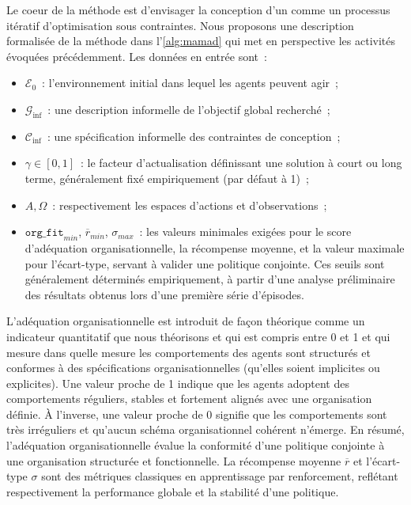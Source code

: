 Le coeur de la méthode  est d'envisager la conception d'un  comme un processus itératif d'optimisation sous contraintes. Nous proposons une description formalisée de la méthode  dans l'\autoref{alg:mamad} qui met en perspective les activités évoquées précédemment. Les données en entrée sont~:
\begin{itemize}
  \item $\mathcal{E}_0$~: l'environnement initial dans lequel les agents peuvent agir~;
  \item $\mathcal{G}_{\text{inf}}$~: une description informelle de l'objectif global recherché~;
  \item $\mathcal{C}_{\text{inf}}$~: une spécification informelle des contraintes de conception~;
  \item $\gamma \in [0,1]$~: le facteur d'actualisation définissant une solution à court ou long terme, généralement fixé empiriquement (par défaut à 1)~;
  \item $A, \Omega$~: respectivement les espaces d'actions et d'observations~;
  \item $\texttt{org\_fit}_{min}$, $\overline{r}_{min}$, $\sigma_{max}$~: les valeurs minimales exigées pour le score d'adéquation organisationnelle, la récompense moyenne, et la valeur maximale pour l'écart-type, servant à valider une politique conjointe. Ces seuils sont généralement déterminés empiriquement, à partir d'une analyse préliminaire des résultats obtenus lors d'une première série d'épisodes.
\end{itemize}

L'adéquation organisationnelle est introduit de façon théorique comme un indicateur quantitatif que nous théorisons et qui est compris entre 0 et 1 et qui mesure dans quelle mesure les comportements des agents sont structurés et conformes à des spécifications organisationnelles (qu'elles soient implicites ou explicites). Une valeur proche de 1 indique que les agents adoptent des comportements réguliers, stables et fortement alignés avec une organisation définie. À l'inverse, une valeur proche de 0 signifie que les comportements sont très irréguliers et qu'aucun schéma organisationnel cohérent n'émerge. En résumé, l'adéquation organisationnelle évalue la conformité d'une politique conjointe à une organisation structurée et fonctionnelle.
La récompense moyenne $\overline{r}$ et l'écart-type $\sigma$ sont des métriques classiques en apprentissage par renforcement, reflétant respectivement la performance globale et la stabilité d'une politique.


